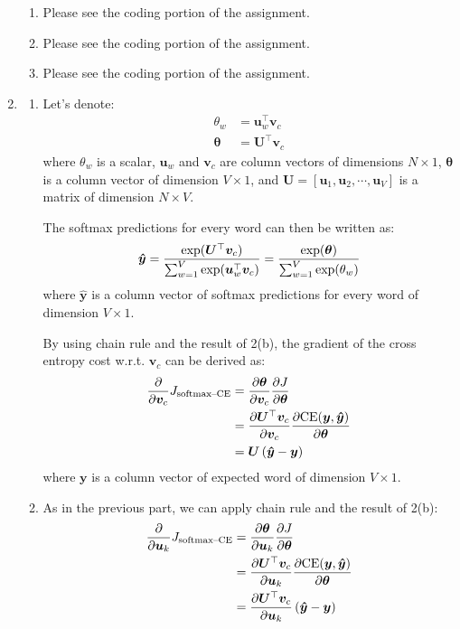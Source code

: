\documentclass[10pt,reqno]{amsart}
\begin{document}
\begin{enumerate}[topsep=0pt,itemsep=3ex,partopsep=1ex,parsep=1ex]
\begin{enumerate}[itemsep=2ex]
  \item Please see the coding portion of the assignment.
  \item Please see the coding portion of the assignment.
  \item Please see the coding portion of the assignment.
  \end{enumerate}


\item
  \begin{enumerate}[itemsep=2ex]
  \item
    Let's denote:
    \begin{align*}
      \theta_w &= \bm{u}_w^\top \bm{v}_c \\
      \bm{\theta} &= \bm{U}^\top \bm{v}_c
    \end{align*}
    where $\theta_w$ is a scalar,
    $\bm{u}_w$ and $\bm{v}_c$ are column vectors of dimensions $N \times 1$,
    $\bm{\theta}$ is a column vector of dimension $V \times 1$, 
    and $\bm{U} = [\bm{u}_1, \bm{u}_2, \cdots, \bm{u}_V]$ is a matrix of dimension $N \times V$.

    The softmax predictions for every word can then be written as:
    \begin{equation*}
      \bm{\hat{y}} = \frac{\exp(\bm{U}^\top \bm{v}_c)}{\sum_{w=1}^{V} \exp(\bm{u}_w^\top \bm{v}_c)}
      = \frac{\exp(\bm{\theta})}{\sum_{w=1}^{V} \exp(\theta_w)}
    \end{equation*}
    where $\bm{\hat{y}}$ is a column vector of softmax predictions for every word of dimension $V \times 1$.

    By using chain rule and the result of 2(b), the gradient of the cross entropy cost w.r.t. $\bm{v}_c$ 
    can be derived as:
    \begin{align*}
      \frac{\partial}{\partial \bm{v}_c} J_\text{softmax--CE}
      &= \frac{\partial \bm{\theta}}{\partial \bm{v}_c} \frac{\partial J}{\partial \bm{\theta}} \\
      &= \frac{\partial \bm{U}^\top \bm{v}_c}{\partial \bm{v}_c} \frac{\partial \text{CE}(\bm{y}, \bm{\hat{y}})}{\partial \bm{\theta}} \\
      &= \bm{U} \left( \bm{\hat{y}} - \bm{y} \right)
    \end{align*}
    where $\bm{y}$ is a column vector of expected word of dimension $V \times 1$.
  \item
    As in the previous part, we can apply chain rule and the result of 2(b):
    \begin{align}
      \frac{\partial}{\partial \bm{u}_k} J_\text{softmax--CE}
      &= \frac{\partial \bm{\theta}}{\partial \bm{u}_k} \frac{\partial J}{\partial \bm{\theta}} \nonumber \\
      &= \frac{\partial \bm{U}^\top \bm{v}_c}{\partial \bm{u}_k} \frac{\partial \text{CE}(\bm{y}, \bm{\hat{y}})}{\partial \bm{\theta}} \nonumber \\
      &= \frac{\partial \bm{U}^\top \bm{v}_c}{\partial \bm{u}_k} \left( \bm{\hat{y}} - \bm{y} \right) \label{3b}
    \end{align}
    

\end{enumerate}
\end{enumerate}
\end{document}
